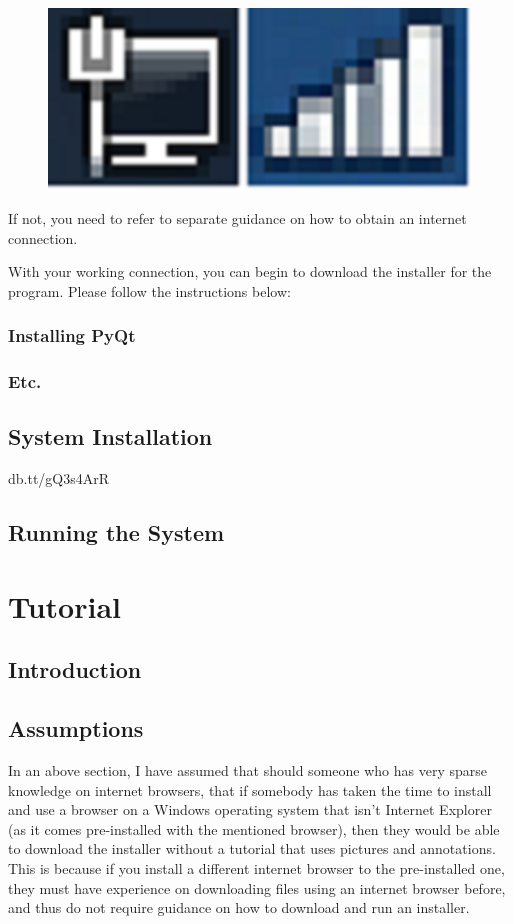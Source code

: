 \begin{figure}[H]
    \includegraphics[width=\textwidth]{./Manual/Images/Connection.png}
\end{figure}
 If not, you need to refer to separate guidance on how to obtain an internet connection.

With your working connection, you can begin to download the installer for the program. Please follow the instructions below:

\subsubsection{Installing PyQt}

\subsubsection{Etc.}

\subsection{System Installation}
db.tt/gQ3s4ArR
\subsection{Running the System}

\section{Tutorial}

\subsection{Introduction}

\subsection{Assumptions}
In an above section, I have assumed that should someone who has very sparse knowledge on internet browsers, that if somebody has taken the time to install and use a browser on a Windows operating system that isn't Internet Explorer (as it comes pre-installed with the mentioned browser), then they would be able to download the installer without a tutorial that uses pictures and annotations. This is because if you install a different internet browser to the pre-installed one, they must have experience on downloading files using an internet browser before, and thus do not require guidance on how to download and run an installer.

